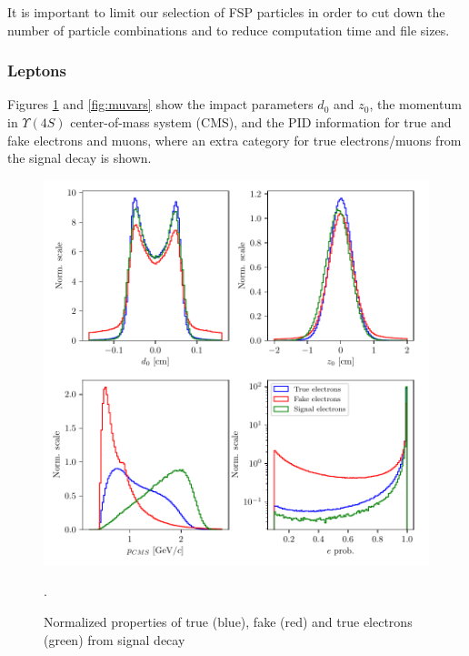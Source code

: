 \documentclass[oneside,a4paper,openany,12pt]{scrbook}
\begin{document}
It is important to limit our selection of FSP particles in order to cut down the number of particle combinations and to reduce computation time and file sizes.

\subsubsection{Leptons}

Figures \ref{fig:evars} and \ref{fig:muvars} show the impact parameters $d_0$ and $z_0$, the momentum in  $\Upsilon(4S)$ center-of-mass system (CMS), and the PID information for true and fake electrons and muons, where an extra category for true electrons/muons from the signal decay is shown.

\begin{figure}[H]
\centering
\includegraphics[scale=0.8]{fig/FSP_e_vars}
\captionsetup{width=.7\linewidth}
\caption{Normalized properties of true (blue), fake (red) and true electrons (green) from signal decay}.
\label{fig:evars}
\end{figure}
\end{document}
